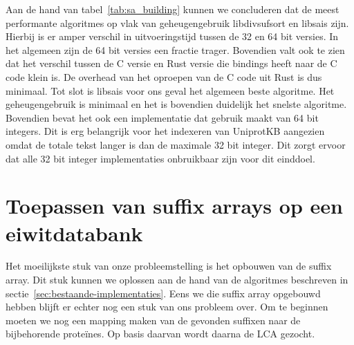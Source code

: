 Aan de hand van tabel~\ref{tab:sa_building} kunnen we concluderen dat de meest performante algoritmes op vlak van geheugengebruik libdivsufsort en libsais zijn.
Hierbij is er amper verschil in uitvoeringstijd tussen de 32 en 64 bit versies.
In het algemeen zijn de 64 bit versies een fractie trager.
Bovendien valt ook te zien dat het verschil tussen de C versie en Rust versie die bindings heeft naar de C code klein is.
De overhead van het oproepen van de C code uit Rust is dus minimaal.
Tot slot is libsais voor ons geval het algemeen beste algoritme.
Het geheugengebruik is minimaal en het is bovendien duidelijk het snelste algoritme.
Bovendien bevat het ook een implementatie dat gebruik maakt van 64 bit integers.
Dit is erg belangrijk voor het indexeren van UniprotKB aangezien omdat de totale tekst langer is dan de maximale 32 bit integer.
Dit zorgt ervoor dat alle 32 bit integer implementaties onbruikbaar zijn voor dit einddoel.

\section{Toepassen van suffix arrays op een eiwitdatabank}\label{sec:toepassen-van-suffix-arrays-op-een-eiwitdatabank}
Het moeilijkste stuk van onze probleemstelling is het opbouwen van de suffix array.
Dit stuk kunnen we oplossen aan de hand van de algoritmes beschreven in sectie~\ref{sec:bestaande-implementaties}.
Eens we die suffix array opgebouwd hebben blijft er echter nog een stuk van ons probleem over.
Om te beginnen moeten we nog een mapping maken van de gevonden suffixen naar de bijbehorende proteïnes.
Op basis daarvan wordt daarna de LCA gezocht.

